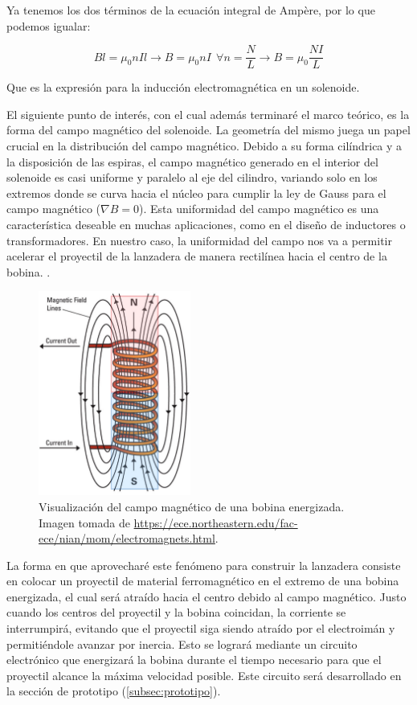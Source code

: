 Ya tenemos los dos términos de la ecuación integral de Ampère, por lo que podemos igualar:

\begin{center}
    \[Bl=\mu_0nIl\to B=\mu_0nI~~\forall n=\frac{N}{L}\to B=\mu_0\frac{NI}{L}\]
\end{center}

Que es la expresión para la inducción electromagnética en un solenoide.

El siguiente punto de interés, con el cual además terminaré el marco teórico, es la forma del campo magnético del solenoide. La geometría del mismo juega un papel crucial en la distribución del campo magnético. Debido a su forma cilíndrica y a la disposición de las espiras, el campo magnético generado en el interior del solenoide es casi uniforme y paralelo al eje del cilindro, variando solo en los extremos donde se curva hacia el núcleo para cumplir la ley de Gauss para el campo magnético (\(\nabla B=0\)). Esta uniformidad del campo magnético es una característica deseable en muchas aplicaciones, como en el diseño de inductores o transformadores. En nuestro caso, la uniformidad del campo nos va a permitir acelerar el proyectil de la lanzadera de manera rectilínea hacia el centro de la bobina.\citep{purcell2013electricidad} \citep{griffiths2005}\citep{tipler2008}.

\begin{figure}[H]
    \centering %
    \includegraphics[width=5cm]{FigurasMemoria/electromagnet.png}
    \caption{Visualización del campo magnético de una bobina energizada. Imagen tomada de \href{URL}{https://ece.northeastern.edu/fac-ece/nian/mom/electromagnets.html}.}
    \label{fig:electromagnet} %
\end{figure}

La forma en que aprovecharé este fenómeno para construir la lanzadera consiste en colocar un proyectil de material ferromagnético en el extremo de una bobina energizada, el cual será atraído hacia el centro debido al campo magnético. Justo cuando los centros del proyectil y la bobina coincidan, la corriente se interrumpirá, evitando que el proyectil siga siendo atraído por el electroimán y permitiéndole avanzar por inercia. Esto se logrará mediante un circuito electrónico que energizará la bobina durante el tiempo necesario para que el proyectil alcance la máxima velocidad posible. Este circuito será desarrollado en la sección de prototipo (\ref{subsec:prototipo}).

